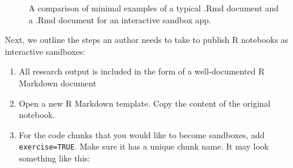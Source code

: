 \begin{Schunk}
\begin{figure}

{\centering {}

}

\caption[A comparison of minimal examples of a typical .Rmd document and a .Rmd document for an interactive sandbox app]{A comparison of minimal examples of a typical .Rmd document and a .Rmd document for an interactive sandbox app.}\label{fig:fig-skeleton}
\end{figure}
\end{Schunk}

Next, we outline the steps an author needs to take to publish R
notebooks as interactive sandboxes:

\begin{enumerate}
\def\labelenumi{\arabic{enumi}.}
\tightlist
\item
  All research output is included in the form of a well-documented R
  Markdown document
\item
  Open a new  R Markdown template. Copy the content of
  the original notebook.
\item
  For the code chunks that you would like to become sandboxes, add
  \texttt{exercise=TRUE}. Make sure it has a unique chunk name. It may
  look something like this:
\end{enumerate}

